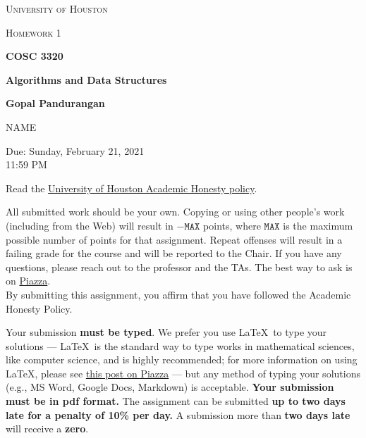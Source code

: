 \documentclass[final]{article}
\begin{document}
\begin{titlepage}
    \begin{center}
        {\scshape\LARGE University of Houston\par}
        \vspace{1cm}
        {\scshape\Large Homework 1 \par}
        \vspace{1.5cm}
        {\huge\bfseries COSC 3320 \par}
        {\huge\bfseries Algorithms and Data Structures \par}
        \vspace{0.5cm}
        {\large\bfseries Gopal Pandurangan\par}
        \vspace{2cm}
        {\Large NAME\par}
        \vspace{0.5cm}
        {\large \par} Due: Sunday, February 21, 2021\\11:59 PM
    \end{center}


    Read the \href{https://www.uh.edu/provost/policies-resources/honesty/_documents-honesty/academic-honesty-policy.pdf}{University of Houston Academic Honesty policy}.

    \begin{tcolorbox}[title=Academic Honesty Policy,colback=red!15,colframe=red!65!black,fonttitle=\bfseries]All submitted work should be your own. Copying or using other people's work (including from the Web) will result in \(-\texttt{MAX}\) points, where \(\texttt{MAX}\) is the maximum possible number of points for that assignment. Repeat offenses will result in a failing grade for the course and will be reported to the Chair. If you have any questions, please reach out to the professor and the TAs. The best way to ask is on \href{https://piazza.com/uh/spring2021/cosc3320/home}{Piazza}.\\

        By submitting this assignment, you affirm that you have followed the Academic Honesty Policy.
    \end{tcolorbox}

    Your submission \textbf{must be typed}. We prefer you use \LaTeX~to type your solutions --- \LaTeX~is the standard way to type works in mathematical sciences, like computer science, and is highly recommended; for more information on using \LaTeX, please see \href{https://piazza.com/class/kjxhee6ctqe6cj?cid=8}{this post on Piazza} --- but any method of typing your solutions (e.g., MS Word, Google Docs, Markdown) is acceptable. \textbf{Your submission must be in pdf format.} The assignment can be submitted \textbf{up to two days late for a penalty of 10\% per day.} A submission more than \textbf{two days late} will receive a \textbf{zero}.


\end{titlepage}
\end{document}
